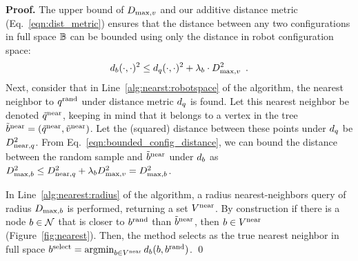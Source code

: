 \noindent
{\bf Proof.}
The upper bound of $D_{\textrm{max},v}$ and our additive distance metric (Eq.~\eqref{eqn:dist_metric}) ensures that the distance between any two configurations in full space $\mathbb{B}$ can be bounded using only the distance in robot configuration space:
\begin{equation}
    d_b(\cdot,\cdot)^2 \leq d_q(\cdot,\cdot)^2 + \lambda_b \cdot D_{\textrm{max},v}^2 \enspace .
    \label{eqn:bounded_config_distance}
\end{equation}
Next, consider that in Line~\ref{alg:nearst:robotspace} of the algorithm, the nearest neighbor to $q^\textrm{rand}$ under distance metric $d_q$ is found.  Let this nearest neighbor be denoted $\tilde{q}^\textrm{near}$, keeping in mind that it belongs to a vertex in the tree $\tilde{b}^\textrm{near} = (\tilde{q}^\textrm{near}, \tilde{v}^\textrm{near})$.  Let the (squared) distance between these points under $d_q$ be $D_{\textrm{near},q}^2$.  From Eq.~\eqref{eqn:bounded_config_distance}, we can bound the distance between the random sample and $\tilde{b}^\textrm{near}$ under $d_b$ as $D_{\textrm{max},b}^2 \leq D_{\textrm{near},q}^2 + \lambda_b D_{\textrm{max},v}^2 = D_{\textrm{max},b}^2$.

In Line~\ref{alg:nearest:radius} of the algorithm, a radius nearest-neighbors query of radius $D_{\textrm{max},b}$ is performed, returning a set $V^{\textrm{near}}$.  By construction if there is a node $b \in \mathcal{N}$ that is closer to $b^\textrm{rand}$ than $\tilde{b}^\textrm{near}$, then $b \in V^{\textrm{near}}$ (Figure~\ref{fig:nearest}). Then, the method selects as the true nearest neighbor in full space $b^\textrm{select} = \operatorname*{argmin}_{b \in V^{\textrm{near}}}{d_b(b, b^\textrm{rand})}$.
\qed


